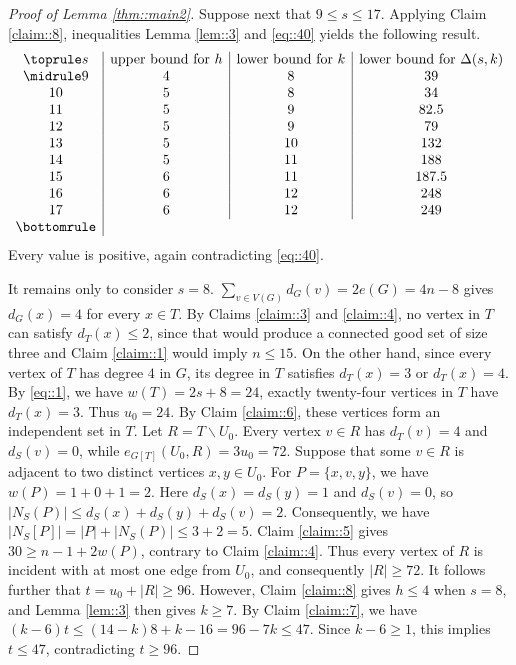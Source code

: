 \documentclass[11pt]{article}
\theoremstyle{definition}
\begin{document}
\begin{proof}[Proof of Lemma \ref{thm::main2}]
  Suppose next that $9\leq s\leq 17$. Applying Claim \ref{claim::8}, inequalities Lemma \ref{lem::3}  and \eqref{eq::40} yields the following result.
  \[
    \begin{array}{c|c|c|c}
      \toprule
      s  & \text{upper bound for }h           & \text{lower bound for }k
         & \text{lower bound for }\Delta(s,k)                                    \\
      \midrule
      9  & 4                                  & 8                        & 39    \\
      10 & 5                                  & 8                        & 34    \\
      11 & 5                                  & 9                        & 82.5  \\
      12 & 5                                  & 9                        & 79    \\
      13 & 5                                  & 10                       & 132   \\
      14 & 5                                  & 11                       & 188   \\
      15 & 6                                  & 11                       & 187.5 \\
      16 & 6                                  & 12                       & 248   \\
      17 & 6                                  & 12                       & 249   \\
      \bottomrule
    \end{array}
  \]
  Every value is positive, again contradicting \eqref{eq::40}.

  It remains only to consider $s=8$. $\sum_{v\in V(G)}d_G(v)=2e(G)=4n-8$ gives $d_G(x)=4$ for every $x\in T$. By Claims \ref{claim::3} and \ref{claim::4}, no vertex in $T$ can satisfy $d_T(x)\leq 2$, since that would produce a connected good set of size three and Claim \ref{claim::1} would imply $n\leq 15$. On the other hand, since every vertex of $T$ has degree $4$ in $G$, its degree in $T$ satisfies $d_T(x)=3$ or $d_T(x)=4$. By \eqref{eq::1}, we have $w(T)=2s+8=24$, exactly twenty-four vertices in $T$ have $d_T(x)=3$. Thus $u_0=24$.
  By Claim \ref{claim::6}, these vertices form an independent set in $T$. Let $R=T\backslash U_0$. Every vertex $v\in R$ has $d_T(v)=4$ and $d_S(v)=0$, while $e_{G[T]}(U_0,R)=3u_0=72$. Suppose that some $v\in R$ is adjacent to two distinct vertices $x,y\in U_0$. For $P=\{x,v,y\}$, we have $w(P)=1+0+1=2$. Here $d_S(x)=d_S(y)=1$ and $d_S(v)=0$, so $|N_S(P)|\leq d_S(x)+d_S(y)+d_S(v)=2$.
  Consequently, we have $|N_S[P]|=|P|+|N_S(P)|\leq 3+2=5$.
  Claim \ref{claim::5} gives $30\geq n-1+2w(P)$, contrary to Claim \ref{claim::4}. Thus every vertex of $R$ is incident with at most one edge from $U_0$, and consequently $|R|\geq 72$. It follows further that $t=u_0+|R|\geq96$. However, Claim \ref{claim::8} gives $h\le4$ when $s=8$, and Lemma \ref{lem::3} then gives $k\geq 7$. By Claim \ref{claim::7}, we have $(k-6)t\leq(14-k)8+k-16=96-7k\leq47$. Since $k-6\geq1$, this implies $t\leq 47$, contradicting $t\geq 96$.


\end{proof}
\end{document}
